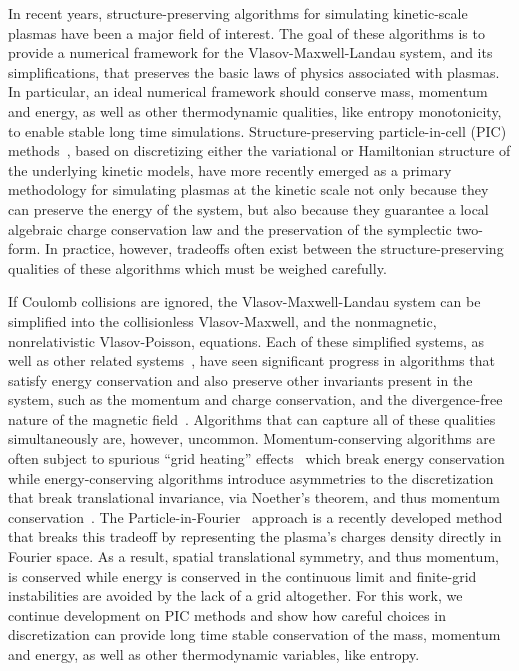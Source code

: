 \documentclass[preprint,12pt]{elsarticle}
\theoremstyle{definition}
\begin{document}
In recent years, structure-preserving algorithms for simulating kinetic-scale plasmas have been a major field of interest. The goal of these algorithms is to provide a numerical framework for the Vlasov-Maxwell-Landau system, and its simplifications, that preserves the basic laws of physics associated with plasmas. In particular, an ideal numerical framework should conserve mass, momentum and energy, as well as other thermodynamic qualities, like entropy monotonicity, to enable stable long time simulations. Structure-preserving particle-in-cell (PIC) methods~\cite{Morrison2017,Kraus2017_GEMPIC,Qin2016,Shadwick2014,Stamm2014,Xiao2016,Xiao2018}, based on discretizing either the variational or Hamiltonian structure of the underlying kinetic models, have more recently emerged as a primary methodology for simulating plasmas at the kinetic scale not only because they can preserve the energy of the system, but also because they guarantee a local algebraic charge conservation law and the preservation of the symplectic two-form. In practice, however, tradeoffs often exist between the structure-preserving qualities of these algorithms which must be weighed carefully.

If Coulomb collisions are ignored, the Vlasov-Maxwell-Landau system can be simplified into the collisionless Vlasov-Maxwell, and the nonmagnetic, nonrelativistic Vlasov-Poisson, equations. Each of these simplified systems, as well as other related systems~\cite{Chen2011}, have seen significant progress in algorithms that satisfy energy conservation and also preserve other invariants present in the system, such as the momentum and charge conservation, and the divergence-free nature of the magnetic field~\cite{He2015,Squire2012,Xiao2015}. Algorithms that can capture all of these qualities simultaneously are, however, uncommon. Momentum-conserving algorithms are often subject to spurious ``grid heating'' effects~\cite{Werner2025} which break energy conservation while energy-conserving algorithms introduce asymmetries to the discretization that break translational invariance, via Noether's theorem, and thus momentum conservation~\cite{Markidis2011}. The Particle-in-Fourier~\cite{Evstatiev2013,Mitchell2019} approach is a recently developed method that breaks this tradeoff by representing the plasma's charges density directly in Fourier space. As a result, spatial translational symmetry, and thus momentum, is conserved while energy is conserved in the continuous limit and finite-grid instabilities are avoided by the lack of a grid altogether. For this work, we continue development on PIC methods and show how careful choices in discretization can provide long time stable conservation of the mass, momentum and energy, as well as other thermodynamic variables, like entropy.
 
\end{document}
